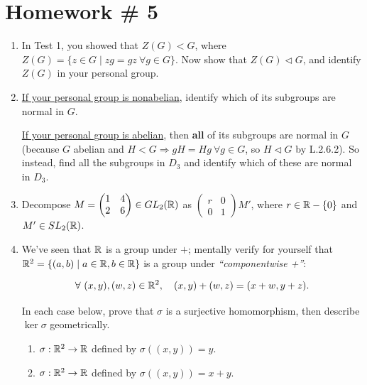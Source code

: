 \section*{Homework \# 5}
\label{sec:HW5}

\begin{enumerate}
    \item In Test 1, you showed that \( Z(G) < G \), where \( Z(G) = \{ z \in G \mid zg = gz \ \forall g \in G \} \). Now show that \( Z(G) \triangleleft G \), and identify \( Z(G) \) in your personal group. \\ \steezybreak

    \item \ul{If your personal group is nonabelian}, identify which of its subgroups are normal in \( G \).

    \ul{If your personal group is abelian}, then \textbf{all} of its subgroups are normal in \( G \) (because \( G \) abelian and \( H < G \Rightarrow gH = Hg \ \forall g \in G \), so \( H \triangleleft G \) by L.2.6.2). So instead, find all the subgroups in \( D_3 \) and identify which of these are normal in \( D_3 \). \\ \steezybreak


    \item Decompose \( M = \begin{pmatrix} 1 & 4 \\ 2 & 6 \end{pmatrix} \in GL_2({\mathbb{ R}}) \) as \( \begin{pmatrix} r & 0 \\ 0 & 1 \end{pmatrix} M' \), where \( r \in {\mathbb{ R}} - \{0\} \) and \( M' \in SL_2({\mathbb{ R}}) \). \\ \steezybreak
     

    \item We've seen that \( {\mathbb{ R}} \) is a group under \( + \); mentally verify for yourself that \( {\mathbb{ R}}^2 = \{(a,b) \mid a \in {\mathbb{ R}}, b \in {\mathbb{ R}} \} \) is a group under \textit{``componentwise +''}:
    
    \[
    \forall \ (x,y), (w,z) \in {\mathbb{ R}}^2, \quad (x,y) + (w,z) = (x+w, y+z).
    \]
    
    In each case below, prove that \( \sigma \) is a surjective homomorphism, then describe \( \ker \sigma \) geometrically.
    
    \begin{enumerate}
        \item \( \sigma: {\mathbb{ R}}^2 \to {\mathbb{ R}} \) defined by \( \sigma((x,y)) = y \).
        \item \( \sigma: {\mathbb{ R}}^2 \to {\mathbb{ R}} \) defined by \( \sigma((x,y)) = x+y \). \\ \steezybreak
        

\end{enumerate}
\end{enumerate}
